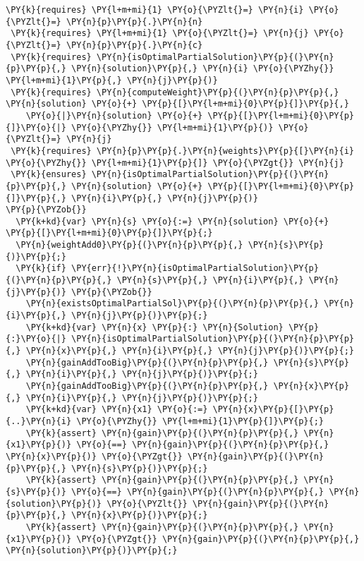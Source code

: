 \begin{sloppypar}
\begin{Verbatim}[commandchars=\\\{\}]
 \PY{k}{requires} \PY{l+m+mi}{1} \PY{o}{\PYZlt{}=} \PY{n}{i} \PY{o}{\PYZlt{}=} \PY{n}{p}\PY{p}{.}\PY{n}{n}
 \PY{k}{requires} \PY{l+m+mi}{1} \PY{o}{\PYZlt{}=} \PY{n}{j} \PY{o}{\PYZlt{}=} \PY{n}{p}\PY{p}{.}\PY{n}{c}
 \PY{k}{requires} \PY{n}{isOptimalPartialSolution}\PY{p}{(}\PY{n}{p}\PY{p}{,} \PY{n}{solution}\PY{p}{,} \PY{n}{i} \PY{o}{\PYZhy{}} \PY{l+m+mi}{1}\PY{p}{,} \PY{n}{j}\PY{p}{)}
 \PY{k}{requires} \PY{n}{computeWeight}\PY{p}{(}\PY{n}{p}\PY{p}{,} \PY{n}{solution} \PY{o}{+} \PY{p}{[}\PY{l+m+mi}{0}\PY{p}{]}\PY{p}{,} 
    \PY{o}{|}\PY{n}{solution} \PY{o}{+} \PY{p}{[}\PY{l+m+mi}{0}\PY{p}{]}\PY{o}{|} \PY{o}{\PYZhy{}} \PY{l+m+mi}{1}\PY{p}{)} \PY{o}{\PYZlt{}=} \PY{n}{j} 
 \PY{k}{requires} \PY{n}{p}\PY{p}{.}\PY{n}{weights}\PY{p}{[}\PY{n}{i} \PY{o}{\PYZhy{}} \PY{l+m+mi}{1}\PY{p}{]} \PY{o}{\PYZgt{}} \PY{n}{j}
 \PY{k}{ensures} \PY{n}{isOptimalPartialSolution}\PY{p}{(}\PY{n}{p}\PY{p}{,} \PY{n}{solution} \PY{o}{+} \PY{p}{[}\PY{l+m+mi}{0}\PY{p}{]}\PY{p}{,} \PY{n}{i}\PY{p}{,} \PY{n}{j}\PY{p}{)}
\PY{p}{\PYZob{}}
  \PY{k+kd}{var} \PY{n}{s} \PY{o}{:=} \PY{n}{solution} \PY{o}{+} \PY{p}{[}\PY{l+m+mi}{0}\PY{p}{]}\PY{p}{;}
  \PY{n}{weightAdd0}\PY{p}{(}\PY{n}{p}\PY{p}{,} \PY{n}{s}\PY{p}{)}\PY{p}{;}
  \PY{k}{if} \PY{err}{!}\PY{n}{isOptimalPartialSolution}\PY{p}{(}\PY{n}{p}\PY{p}{,} \PY{n}{s}\PY{p}{,} \PY{n}{i}\PY{p}{,} \PY{n}{j}\PY{p}{)} \PY{p}{\PYZob{}}
    \PY{n}{existsOptimalPartialSol}\PY{p}{(}\PY{n}{p}\PY{p}{,} \PY{n}{i}\PY{p}{,} \PY{n}{j}\PY{p}{)}\PY{p}{;}
    \PY{k+kd}{var} \PY{n}{x} \PY{p}{:} \PY{n}{Solution} \PY{p}{:}\PY{o}{|} \PY{n}{isOptimalPartialSolution}\PY{p}{(}\PY{n}{p}\PY{p}{,} \PY{n}{x}\PY{p}{,} \PY{n}{i}\PY{p}{,} \PY{n}{j}\PY{p}{)}\PY{p}{;}
    \PY{n}{gainAddTooBig}\PY{p}{(}\PY{n}{p}\PY{p}{,} \PY{n}{s}\PY{p}{,} \PY{n}{i}\PY{p}{,} \PY{n}{j}\PY{p}{)}\PY{p}{;}
    \PY{n}{gainAddTooBig}\PY{p}{(}\PY{n}{p}\PY{p}{,} \PY{n}{x}\PY{p}{,} \PY{n}{i}\PY{p}{,} \PY{n}{j}\PY{p}{)}\PY{p}{;}
    \PY{k+kd}{var} \PY{n}{x1} \PY{o}{:=} \PY{n}{x}\PY{p}{[}\PY{p}{..}\PY{n}{i} \PY{o}{\PYZhy{}} \PY{l+m+mi}{1}\PY{p}{]}\PY{p}{;}
    \PY{k}{assert} \PY{n}{gain}\PY{p}{(}\PY{n}{p}\PY{p}{,} \PY{n}{x1}\PY{p}{)} \PY{o}{==} \PY{n}{gain}\PY{p}{(}\PY{n}{p}\PY{p}{,} \PY{n}{x}\PY{p}{)} \PY{o}{\PYZgt{}} \PY{n}{gain}\PY{p}{(}\PY{n}{p}\PY{p}{,} \PY{n}{s}\PY{p}{)}\PY{p}{;}  
    \PY{k}{assert} \PY{n}{gain}\PY{p}{(}\PY{n}{p}\PY{p}{,} \PY{n}{s}\PY{p}{)} \PY{o}{==} \PY{n}{gain}\PY{p}{(}\PY{n}{p}\PY{p}{,} \PY{n}{solution}\PY{p}{)} \PY{o}{\PYZlt{}} \PY{n}{gain}\PY{p}{(}\PY{n}{p}\PY{p}{,} \PY{n}{x}\PY{p}{)}\PY{p}{;}
    \PY{k}{assert} \PY{n}{gain}\PY{p}{(}\PY{n}{p}\PY{p}{,} \PY{n}{x1}\PY{p}{)} \PY{o}{\PYZgt{}} \PY{n}{gain}\PY{p}{(}\PY{n}{p}\PY{p}{,} \PY{n}{solution}\PY{p}{)}\PY{p}{;}

\end{Verbatim}
\end{sloppypar}
